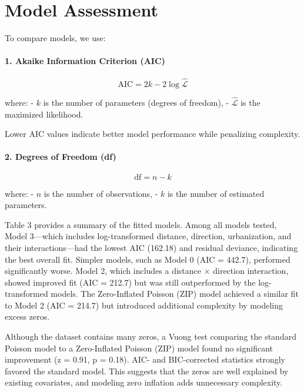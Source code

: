 \documentclass[
  12pt,
]{article}
\begin{document}
\section{Model Assessment}\label{model-assessment}

To compare models, we use:

\paragraph{1. Akaike Information Criterion
(AIC)}\label{akaike-information-criterion-aic}

\[
\text{AIC} = 2k - 2 \log \hat{\mathcal{L}}
\]

where: - \(k\) is the number of parameters (degrees of freedom), -
\(\hat{\mathcal{L}}\) is the maximized likelihood.

Lower AIC values indicate better model performance while penalizing
complexity.

\paragraph{2. Degrees of Freedom (df)}\label{degrees-of-freedom-df}

\[
\text{df} = n - k
\]

where: - \(n\) is the number of observations, - \(k\) is the number of
estimated parameters.

Table 3 provides a summary of the fitted models. Among all models
tested, Model 3---which includes log-transformed distance, direction,
urbanization, and their interactions---had the lowest AIC (162.18) and
residual deviance, indicating the best overall fit. Simpler models, such
as Model 0 (AIC = 442.7), performed significantly worse. Model 2, which
includes a distance × direction interaction, showed improved fit (AIC =
212.7) but was still outperformed by the log-transformed models. The
Zero-Inflated Poisson (ZIP) model achieved a similar fit to Model 2 (AIC
= 214.7) but introduced additional complexity by modeling excess zeros.

Although the dataset contains many zeros, a Vuong test comparing the
standard Poisson model to a Zero-Inflated Poisson (ZIP) model found no
significant improvement (z = 0.91, p = 0.18). AIC- and BIC-corrected
statistics strongly favored the standard model. This suggests that the
zeros are well explained by existing covariates, and modeling zero
inflation adds unnecessary complexity.
\end{document}

